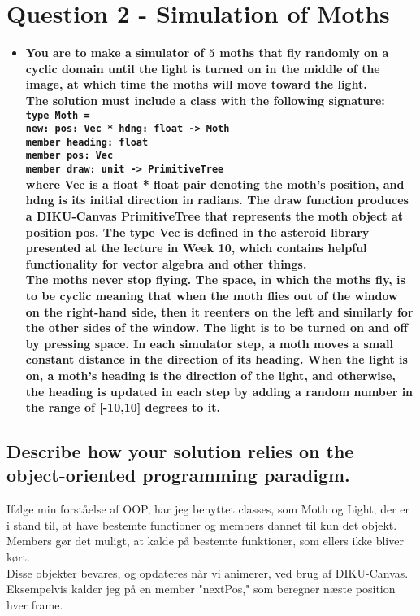 \documentclass[a4paper,12pt]{article}
\begin{document}
\section{Question 2 - Simulation of Moths}
\begin{itemize}
    \item[] \textbf{You are to make a simulator of 5 moths that fly randomly on a cyclic domain until the light is turned on in the middle of the image, at which time the moths will move toward the light.\\
The solution must include a class with the following signature:\\
\lstinline{type Moth =}\\
\lstinline{new: pos: Vec * hdng: float -> Moth}\\
\lstinline{member heading: float}\\
\lstinline{member pos: Vec}\\
\lstinline{member draw: unit -> PrimitiveTree}\\
where Vec is a float * float pair denoting the moth's position, and hdng is its initial direction in radians. The draw function produces a DIKU-Canvas PrimitiveTree that represents the moth object at position pos. The type Vec is defined in the asteroid library presented at the lecture in Week 10, which contains helpful functionality for vector algebra and other things.\\
The moths never stop flying. The space, in which the moths fly, is to be cyclic meaning that when the moth flies out of the window on the right-hand side, then it reenters on the left and similarly for the other sides of the window. The light is to be turned on and off by pressing space. In each simulator step, a moth moves a small constant distance in the direction of its heading. When the light is on, a moth's heading is the direction of the light, and otherwise, the heading is updated in each step by adding a random number in the range of [-10,10] degrees to it.}
\end{itemize}

\subsection{Describe how your solution relies on the object-oriented programming paradigm.}
Ifølge min forståelse af OOP, har jeg benyttet classes, som Moth og Light, der er i stand til, at have bestemte functioner og members dannet til kun det objekt. Members gør det muligt, at kalde på bestemte funktioner, som ellers ikke bliver kørt.\\
Disse objekter bevares, og opdateres når vi animerer, ved brug af DIKU-Canvas. Eksempelvis kalder jeg på en member "nextPos," som beregner næste position hver frame.
\end{document}
